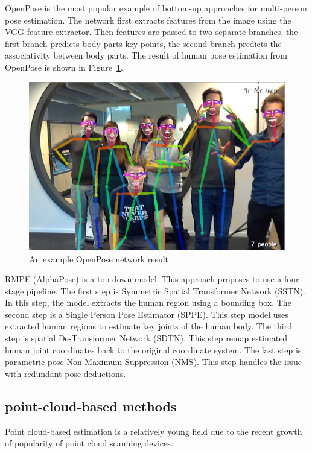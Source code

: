 OpenPose \parencite{cao_openpose_2019} is the most popular example of bottom-up approaches for multi-person pose estimation. The network first extracts features from the image using the VGG feature extractor. Then features are passed to two separate branches, the first branch predicts body parts key points, the second branch predicts the associativity between body parts. The result of human pose estimation from OpenPose is shown in Figure~\ref{img:openpose}.

\begin{figure}[htbp]
    \centerline{\includegraphics[scale=0.15]{Figures/OpenPose.png}}
    \caption{An example OpenPose network result  \parencite{cao_openpose_2019}}
    \label{img:openpose}
\end{figure}


RMPE (AlphaPose) \parencite{fang_rmpe_2018} is a top-down model.
This approach proposes to use a four-stage pipeline. The first step is Symmetric Spatial Transformer Network (SSTN). In this step, the model extracts the human region using a bounding box. The second step is a Single Person Pose Estimator (SPPE). This step model uses extracted human regions to estimate key joints of the human body. The third step is spatial De-Transformer Network (SDTN). This step remap estimated human joint coordinates back to the original coordinate system. The last step is parametric pose Non-Maximum Suppression (NMS). This step handles the issue with redundant pose deductions.

\subsection{point-cloud-based methods} 
Point cloud-based estimation is a relatively young field due to the recent growth of popularity of point cloud scanning devices.

